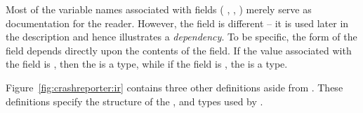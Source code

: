 Most of the variable names associated with fields (\eg{}
, , \etc{}) merely serve as documentation for the reader.
However, the  field is different -- it is used later in the 
description and hence illustrates a {\em dependency}.  
To be specific, the form of the
 field depends directly upon the contents of the 
field.  If the value associated with the
 field is , then the  is
a  type, while if the  field is ,
the  is a  type.  

Figure~\ref{fig:crashreporter:ir} contains three other definitions
aside from .  These definitions specify the
structure of the  ,  and 
types used by .





